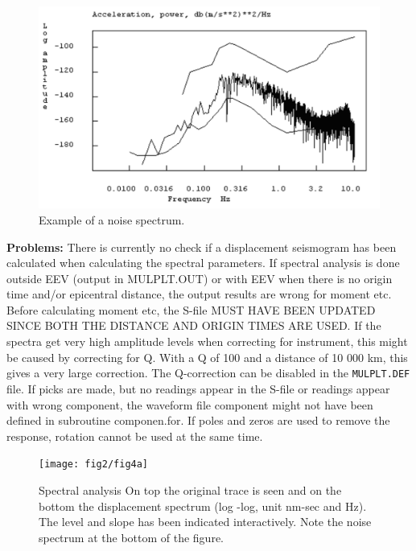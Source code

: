 \begin{figure}
\centerline{\includegraphics[width=0.9\linewidth]{fig/fig23}}
\caption{Example of a noise spectrum.}
\label{fig:noise-spec}
\end{figure}


\textbf{Problems:}
There is currently no check if a displacement seismogram has been calculated when calculating the spectral parameters. If spectral analysis is done outside EEV (output in MULPLT.OUT) or with EEV when there is no origin time and/or epicentral distance, the output results are wrong for moment etc. Before calculating moment etc, the S-file MUST HAVE BEEN UPDATED SINCE BOTH THE DISTANCE AND ORIGIN TIMES ARE USED. If the spectra get very high amplitude levels when correcting for instrument, this might be caused by correcting for Q. With a Q of 100 and a distance of 10 000 km, this gives a very large correction. The Q-correction can be disabled in the \texttt{MULPLT.DEF} file. If picks are made, but no readings appear in the S-file or readings appear with wrong component, the waveform file component might not have been defined in subroutine componen.for. If poles and zeros are used to remove the response, rotation cannot be used at the same time. 

\begin{figure}
\centerline{\texttt{[image: fig2/fig4a]}}
\caption{Spectral analysis\newline
On top the original trace is seen and on the bottom the 
displacement spectrum (log -log, unit nm-sec and Hz). The level 
and slope has been indicated interactively. Note the noise spectrum 
at the bottom of the figure.}
\label{fig:mulplt-spec}
\end{figure}

